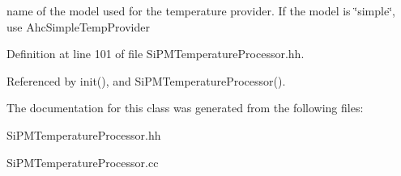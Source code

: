 name of the model used for the temperature provider. If the model is \char`\"{}simple\char`\"{}, use AhcSimpleTempProvider 

Definition at line 101 of file SiPMTemperatureProcessor.hh.

Referenced by init(), and SiPMTemperatureProcessor().

The documentation for this class was generated from the following files:\begin{DoxyCompactItemize}
\item 
SiPMTemperatureProcessor.hh\item 
SiPMTemperatureProcessor.cc\end{DoxyCompactItemize}
